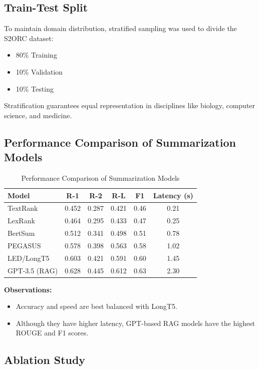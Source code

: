 \documentclass[conference]{IEEEtran}
\begin{document}
\subsection{Train-Test Split}

To maintain domain distribution, stratified sampling was used to divide the S2ORC dataset:

\begin{itemize}
    \item 80\% Training
    \item 10\% Validation
    \item 10\% Testing
\end{itemize}

Stratification guarantees equal representation in disciplines like biology, computer science, and medicine.

\subsection{Performance Comparison of Summarization Models}

\begin{table}[h]
\centering
\caption{Performance Comparison of Summarization Models}
\begin{tabular}{lccccc}
\hline
\textbf{Model} & \textbf{R-1} & \textbf{R-2} & \textbf{R-L} & \textbf{F1} & \textbf{Latency (s)} \\
\hline
TextRank & 0.452 & 0.287 & 0.421 & 0.46 & 0.21 \\
LexRank & 0.464 & 0.295 & 0.433 & 0.47 & 0.25 \\
BertSum & 0.512 & 0.341 & 0.498 & 0.51 & 0.78 \\
PEGASUS & 0.578 & 0.398 & 0.563 & 0.58 & 1.02 \\
LED/LongT5 & 0.603 & 0.421 & 0.591 & 0.60 & 1.45 \\
GPT-3.5 (RAG) & 0.628 & 0.445 & 0.612 & 0.63 & 2.30 \\
\hline
\end{tabular}
\end{table}

\textbf{Observations:}
\begin{itemize}
    \item Accuracy and speed are best balanced with LongT5.
    \item Although they have higher latency, GPT-based RAG models have the highest ROUGE and F1 scores.
\end{itemize}

\subsection{Ablation Study}
\end{document}
